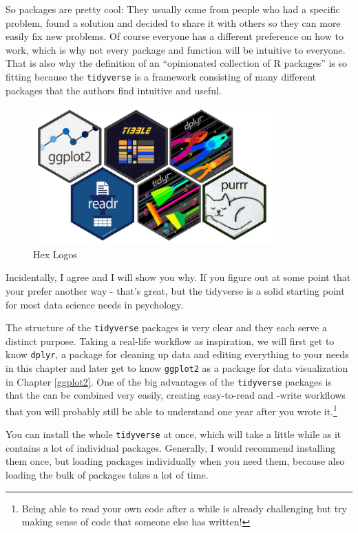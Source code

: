 \documentclass[
]{book}
\begin{document}
So packages are pretty cool: They usually come from people who had a specific problem, found a solution and decided to share it with others so they can more easily fix new problems.
Of course everyone has a different preference on how to work, which is why not every package and function will be intuitive to everyone.
That is also why the definition of an ``opinionated collection of R packages'' is so fitting because the \texttt{tidyverse} is a framework consisting of many different packages that the authors find intuitive and useful.

\begin{figure}
\centering
\includegraphics[width=\textwidth,height=2.08333in]{./img/hexagons.png}
\caption{Hex Logos}
\end{figure}

Incidentally, I agree and I will show you why.
If you figure out at some point that your prefer another way - that's great, but the tidyverse is a solid starting point for most data science needs in psychology.

The structure of the \texttt{tidyverse} packages is very clear and they each serve a distinct purpose.
Taking a real-life workflow as inspiration, we will first get to know \texttt{dplyr}, a package for cleaning up data and editing everything to your needs in this chapter and later get to know \texttt{ggplot2} as a package for data visualization in Chapter \ref{ggplot2}.
One of the big advantages of the \texttt{tidyverse} packages is that the can be combined very easily, creating easy-to-read and -write workflows that you will probably still be able to understand one year after you wrote it.\footnote{Being able to read your own code after a while is already challenging but try making sense of code that someone else has written!}

You can install the whole \texttt{tidyverse} at once, which will take a little while as it contains a lot of individual packages.
Generally, I would recommend installing them once, but loading packages individually when you need them, because also loading the bulk of packages takes a lot of time.
\end{document}
